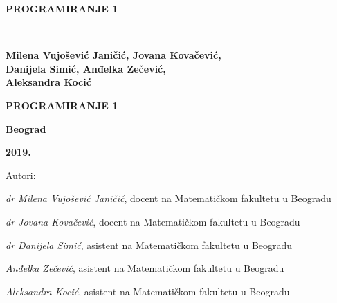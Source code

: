 \pagestyle{empty}

\vspace*{20pt}
\centerline{{\large\bfseries PROGRAMIRANJE 1} \vspace*{2mm}}
\newpage
\verb" "
\newpage
\begin{center}
{\sffamily


\vspace*{1cm}

{\fontsize{16pt}{19pt}\selectfont \bfseries  Milena Vujošević Janičić, Jovana Kovačević,\\ 
Danijela Simić, Anđelka Zečević, \\
Aleksandra Kocić}

\vspace{50pt}
\centerline{{\huge\bfseries PROGRAMIRANJE 1} \vspace*{2mm}}
\centerline{{\huge\bfseries {\fontsize{22pt}{26pt}\selectfont {Zbirka zadataka sa rešenjima }}}}


\vspace{8cm}

\centerline{{\Large \bfseries Beograd}}
\centerline{{\Large \bfseries 2019.}}

}
\end{center}



\newpage


\small

\noindent
Autori: 

\noindent
{\slshape dr Milena Vujošević Janičić}, docent na Matematičkom fakultetu u Beogradu

\noindent
{\slshape dr Jovana Kovačević}, docent na Matematičkom fakultetu u Beogradu

\noindent
{\slshape dr Danijela Simić}, asistent na Matematičkom fakultetu u Beogradu

\noindent
{\slshape Anđelka Zečević}, asistent na Matematičkom fakultetu u Beogradu

\noindent
{\slshape Aleksandra Kocić}, asistent na Matematičkom fakultetu u Beogradu

